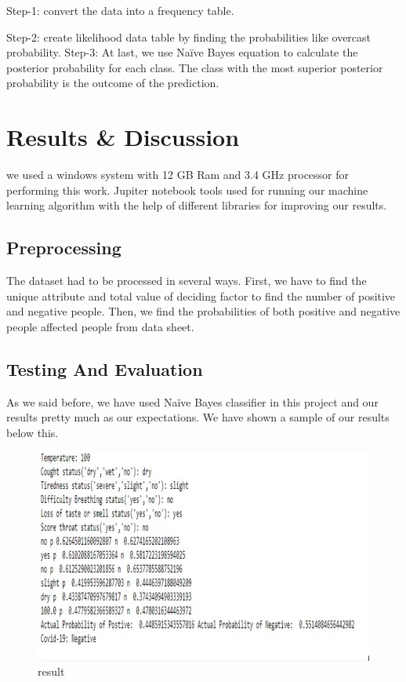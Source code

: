 \documentclass[conference]{IEEEtran}
\begin{document}
Step-1: convert the data into a frequency table.
 
Step-2: create likelihood data table by finding the probabilities like overcast probability.
Step-3: At last, we use Naïve Bayes equation to calculate the posterior probability for each class. The class with the most superior posterior probability is the outcome of the prediction.




\section{Results & Discussion}

we used a windows system with 12 GB Ram and 3.4 GHz processor for performing this work. Jupiter notebook tools used for running our machine learning algorithm with the help of different libraries for improving our results.
\subsection{Preprocessing}
The dataset had to be processed in several ways. First, we have to find the unique attribute and total value of deciding factor to find the number of positive and negative people. Then, we find the probabilities of both positive and negative people affected people from data sheet.



\subsection{Testing And Evaluation}
As we said before, we have used Naïve Bayes classifier in this project and our results pretty much as our expectations. We have shown a sample of our results below this.

\begin{figure}[h!]
    \centering
    \includegraphics[scale=0.5]{result.PNG}
    \caption{result}
    \label{fig:res}
\end{figure}
\end{document}
